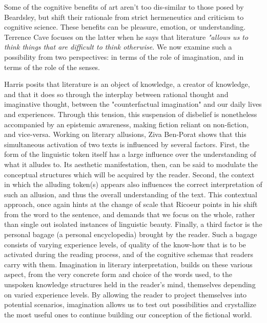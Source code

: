 \documentclass{article}
\begin{document}
Some of the cognitive benefits of art aren't too dis-similar to those posed by Beardsley, but shift their rationale from strict hermeneutics and criticism to cognitive science. These benefits can be pleasure, emotion, or understanding. Terrence Cave focuses on the latter when he says that literature \emph{"allows us to think things that are difficult to think otherwise}. We now examine such a possibility from two perspectives: in terms of the role of imagination, and in terms of the role of the senses.

Harris posits that literature is an object of knowledge, a creator of knowledge, and that it does so through the interplay between rational thought and imaginative thought, between the "counterfactual imagination" and our daily lives and experiences. Through this tension, this suspension of disbelief is nonetheless accompanied by an epistemic awareness, making fiction reliant on non-fiction, and vice-versa. Working on literary allusions, Ziva Ben-Porat shows that this simultaneous activation of two texts is influenced by several factors. First, the form of the linguistic token itself has a large influence over the understanding of what it alludes to. Its aesthetic manifestation, then, can be said to modulate the conceptual structures which will be acquired by the reader. Second, the context in which the alluding token(s) appears also influences the correct interpretation of such an allusion, and thus the overall understanding of the text. This contextual approach, once again hints at the change of scale that Ricoeur points in his shift from the word to the sentence, and demands that we focus on the whole, rather than single out isolated instances of linguistic beauty. Finally, a third factor is the personal bagage (a personal encyclopedia) brought by the reader. Such a bagage consists of varying experience levels, of quality of the know-how that is to be activated during the reading process, and of the cognitive schemas that readers carry with them. Imagination in literary interpretation, builds on these various aspect, from the very concrete form and choice of the words used, to the unspoken knowledge structures held in the reader's mind, themselves depending on varied experience levels. By allowing the reader to project themselves into potential scenarios, imagination allows us to test out possibilities and crystallize the most useful ones to continue building our conception of the fictional world.
\end{document}
